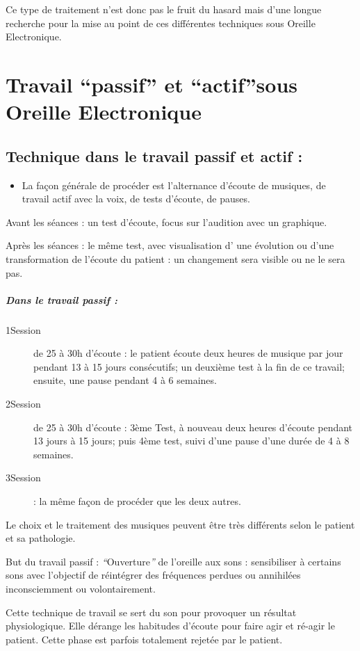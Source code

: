 Ce type de traitement n'est donc pas le fruit du hasard mais d'une
longue recherche pour la mise au point de ces différentes techniques
sous Oreille Electronique.

\section{Travail ``passif'' et ``actif''sous Oreille Electronique}

\subsection{Technique dans le travail passif et actif : }
\begin{itemize}
\item La façon générale de procéder est l'alternance d'écoute de musiques,
de travail actif avec la voix, de tests d'écoute, de pauses.
\end{itemize}
Avant les séances : un test d'écoute, focus sur l'audition avec un
graphique.

Après les séances : le même test, avec visualisation d' une évolution
ou d'une transformation de l'écoute du patient : un changement sera
visible ou ne le sera pas.

\subparagraph{Dans le travail passif : }
\begin{description}
\item [{1\textdegree Session}] de 25 à 30h d'écoute : le patient écoute
deux heures de musique par jour pendant 13 à 15 jours consécutifs;
un deuxième test à la fin de ce travail; ensuite, une pause pendant
4 à 6 semaines.
\item [{2\textdegree Session}] de 25 à 30h d'écoute : 3ème Test, à nouveau
deux heures d'écoute pendant 13 jours à 15 jours; puis 4ème test,
suivi d'une pause d'une durée de 4 à 8 semaines.
\item [{3\textdegree Session}] : la même façon de procéder que les deux
autres. 
\end{description}
Le choix et le traitement des musiques peuvent être très différents
selon le patient et sa pathologie.

But du travail passif : \emph{``}Ouverture\emph{'' }de l'oreille
aux sons : sensibiliser à certains sons avec l'objectif de réintégrer
des fréquences perdues ou annihilées inconsciemment ou volontairement. 

Cette technique de travail se sert du son pour provoquer un résultat
physiologique. Elle dérange les habitudes d'écoute pour faire agir
et ré-agir le patient. Cette phase est parfois totalement rejetée
par le patient.


